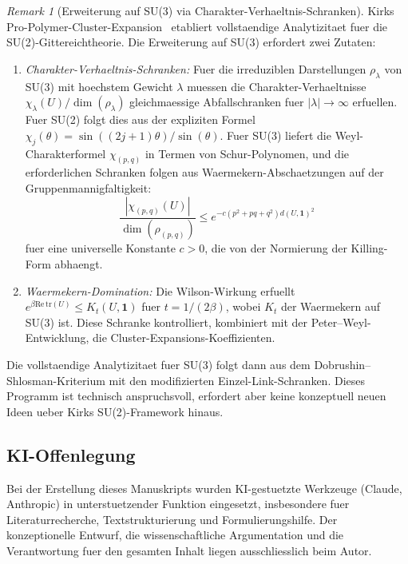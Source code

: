 \documentclass[12pt,a4paper]{article}
\theoremstyle{definition}
\theoremstyle{plain}
\theoremstyle{remark}
\newtheorem{remark}[definition]{Remark}
\begin{document}
\begin{remark}[Erweiterung auf SU(3) via Charakter-Verhaeltnis-Schranken]
\label{rem:su3-extension}
Kirks Pro-Polymer-Cluster-Expansion~\cite{Kirk2026} etabliert vollstaendige Analytizitaet fuer die SU(2)-Gittereichtheorie. Die Erweiterung auf SU(3) erfordert zwei Zutaten:
\begin{enumerate}
\item \emph{Charakter-Verhaeltnis-Schranken:} Fuer die irreduziblen Darstellungen $\rho_\lambda$ von SU(3) mit hoechstem Gewicht $\lambda$ muessen die Charakter-Verhaeltnisse $\chi_\lambda(U)/\dim(\rho_\lambda)$ gleichmaessige Abfallschranken fuer $|\lambda| \to \infty$ erfuellen. Fuer SU(2) folgt dies aus der expliziten Formel $\chi_j(\theta) = \sin((2j+1)\theta)/\sin(\theta)$. Fuer SU(3) liefert die Weyl-Charakterformel $\chi_{(p,q)}$ in Termen von Schur-Polynomen, und die erforderlichen Schranken folgen aus Waermekern-Abschaetzungen auf der Gruppenmannigfaltigkeit:
\[
\frac{|\chi_{(p,q)}(U)|}{\dim(\rho_{(p,q)})} \leq e^{-c(p^2 + pq + q^2) d(U, \mathbf{1})^2}
\]
fuer eine universelle Konstante $c > 0$, die von der Normierung der Killing-Form abhaengt.
\item \emph{Waermekern-Domination:} Die Wilson-Wirkung erfuellt $e^{\beta \mathrm{Re}\,\mathrm{tr}(U)} \leq K_t(U, \mathbf{1})$ fuer $t = 1/(2\beta)$, wobei $K_t$ der Waermekern auf SU(3) ist. Diese Schranke kontrolliert, kombiniert mit der Peter--Weyl-Entwicklung, die Cluster-Expansions-Koeffizienten.
\end{enumerate}
Die vollstaendige Analytizitaet fuer SU(3) folgt dann aus dem Dobrushin--Shlosman-Kriterium mit den modifizierten Einzel-Link-Schranken. Dieses Programm ist technisch anspruchsvoll, erfordert aber keine konzeptuell neuen Ideen ueber Kirks SU(2)-Framework hinaus.
\end{remark}

\subsection*{KI-Offenlegung}
Bei der Erstellung dieses Manuskripts wurden KI-gestuetzte Werkzeuge (Claude, Anthropic)
in unterstuetzender Funktion eingesetzt, insbesondere fuer Literaturrecherche,
Textstrukturierung und Formulierungshilfe. Der konzeptionelle Entwurf,
die wissenschaftliche Argumentation und die Verantwortung fuer den gesamten Inhalt
liegen ausschliesslich beim Autor.
\end{document}
